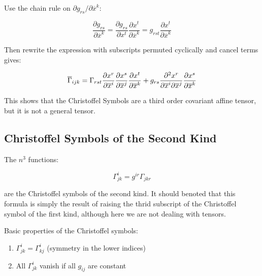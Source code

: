 \documentclass{article}
\begin{document}
\noindent
Use the chain rule on $\partial g_{rs} / \partial \overline{ x }^k$:

\begin{equation*}
	\frac{ \partial g_{rs} }{ \partial \overline{ x }^k } = \frac{ \partial g_{rs} }{ \partial x^t } \frac{ \partial x^t }{ \partial \overline{ x }^k } = g_{rst} \frac{ \partial x^t }{ \partial \overline{ x }^k }
\end{equation*}

\noindent
Then rewrite the expression with subscripts permuted cyclically and cancel terms gives:

\begin{equation}
	\overline{ \Gamma }_{ijk} = \Gamma_{rst} \frac{ \partial x^r }{ \partial \overline{ x }^i } \frac{ \partial x^s }{ \partial \overline{ x }^j } \frac{ \partial x^t }{ \partial \overline{ x }^k } \\
	+ g_{rs} \frac{ \partial^2 x^r }{ \partial \overline{ x }^i \partial \overline{ x }^j } \frac{ \partial x^s }{ \partial \overline{ x }^k } \\
\end{equation}

This shows that the Christoffel Symbols are a third order covariant affine tensor, but it is not a general tensor.

\subsection{Christoffel Symbols of the Second Kind}

The $n^3$ functions:

\begin{equation}
	\Gamma^i_{jk} = g^{ir} \Gamma_{jkr}
\end{equation}

\noindent
are the Christoffel symbols of the second kind.  It should benoted that this formula is simply the result of raising the thrid subscript of the Christoffel symbol of the first kind, 
although here we are not dealing with tensors.

\noindent
Basic properties of the Christoffel symbols:

\begin{enumerate}
	\item $\Gamma^i_{jk} = \Gamma^i_{kj}$ (symmetry in the lower indices)
	\item All $\Gamma^i_{jk}$ vanish if all $g_{ij}$ are constant
\end{enumerate}
\end{document}

